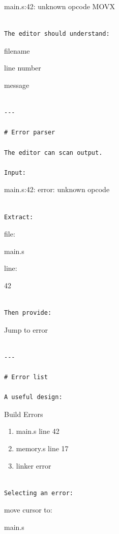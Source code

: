 \documentclass[
  oneside,
  openany]{book}
\begin{document}
main.s:42: unknown opcode MOVX

\begin{verbatim}

The editor should understand:
\end{verbatim}

filename

line number

message

\begin{verbatim}

---

# Error parser

The editor can scan output.

Input:
\end{verbatim}

main.s:42: error: unknown opcode

\begin{verbatim}

Extract:
\end{verbatim}

file:

main.s

line:

42

\begin{verbatim}

Then provide:
\end{verbatim}

Jump to error

\begin{verbatim}

---

# Error list

A useful design:
\end{verbatim}

Build Errors

\begin{enumerate}
\def\labelenumi{\arabic{enumi}.}
\item
  main.s line 42
\item
  memory.s line 17
\item
  linker error
\end{enumerate}

\begin{verbatim}

Selecting an error:
\end{verbatim}

move cursor to:

main.s
\end{document}

